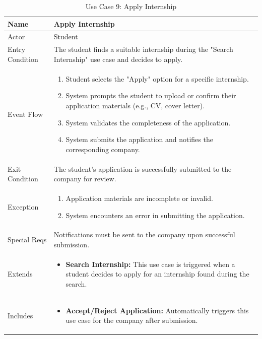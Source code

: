 \begin{table}[H]
\centering
\begin{tabular}{|l|p{12cm}|}
\hline
Name             & Apply Internship \\ \hline
Actor            & Student \\ \hline
Entry Condition  & 
The student finds a suitable internship during the "Search Internship" use case and decides to apply. \\ \hline
Event Flow       & 
\begin{enumerate}
    \item Student selects the "Apply" option for a specific internship.
    \item System prompts the student to upload or confirm their application materials (e.g., CV, cover letter).
    \item System validates the completeness of the application.
    \item System submits the application and notifies the corresponding company.
\end{enumerate} \\ \hline
Exit Condition   & 
The student's application is successfully submitted to the company for review. \\ \hline
Exception        & 
\begin{enumerate}
    \item Application materials are incomplete or invalid.
    \item System encounters an error in submitting the application.
\end{enumerate} \\ \hline
Special Reqs     & 
Notifications must be sent to the company upon successful submission. \\ \hline
Extends      & 
\begin{itemize}
    \item \textbf{Search Internship:} This use case is triggered when a student decides to apply for an internship found during the search.
\end{itemize} \\ \hline
Includes         & 
\begin{itemize}
    \item \textbf{Accept/Reject Application:} Automatically triggers this use case for the company after submission.
\end{itemize} \\ \hline
\end{tabular}
\caption{Use Case 9: Apply Internship}
\label{tab:apply_internship}
\end{table}

